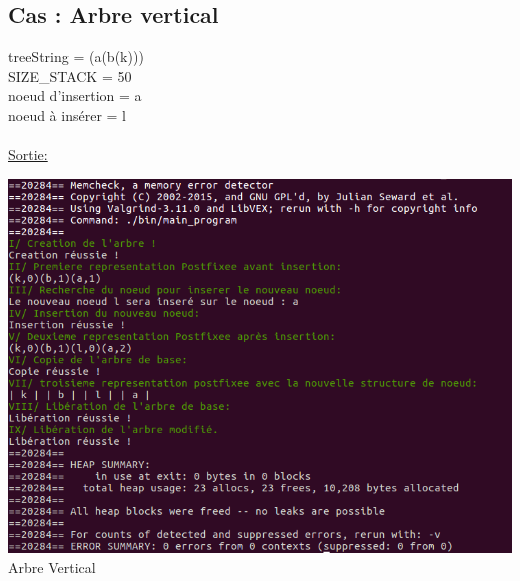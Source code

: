 \documentclass[a4paper]{article}
\begin{document}
\subsection{Cas : Arbre vertical}
treeString = (a(b(k)))
\\ 
SIZE\_STACK = 50
\\
noeud d'insertion = a
\\
noeud à insérer = l
\\
\\
\underline{Sortie: }
\begin{center}
\includegraphics[scale=0.6]{vertical.png}
\\
Arbre Vertical
\end{center}
\end{document}
